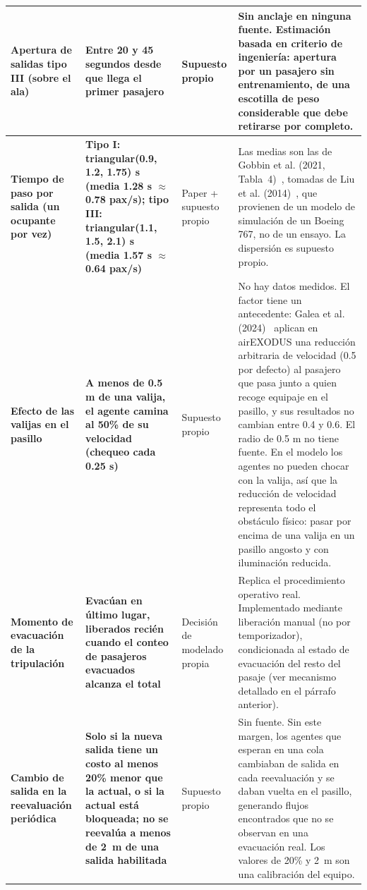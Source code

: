 \documentclass[a4paper, 11pt]{article}
\begin{document}
{\begin{longtable}{L{2.6cm}L{3.2cm}L{2.2cm}L{5.7cm}}
\midrule
\textbf{Apertura de salidas tipo III (sobre el ala)} & \textbf{Entre 20 y 45 segundos desde que llega el primer pasajero} & Supuesto propio & Sin anclaje en ninguna fuente. Estimaci\'on basada en criterio de ingenier\'ia: apertura por un pasajero sin entrenamiento, de una escotilla de peso considerable que debe retirarse por completo. \\
\midrule
\textbf{Tiempo de paso por salida (un ocupante por vez)} & \textbf{Tipo I: triangular(0.9, 1.2, 1.75) s (media 1.28 s $\approx$ 0.78 pax/s); tipo III: triangular(1.1, 1.5, 2.1) s (media 1.57 s $\approx$ 0.64 pax/s)} & Paper + supuesto propio & Las medias son las de Gobbin et al. (2021, Tabla~4)~\cite{gobbin2021}, tomadas de Liu et al. (2014)~\cite{liu2014}, que provienen de un modelo de simulaci\'on de un Boeing 767, no de un ensayo. La dispersi\'on es supuesto propio. \\
\midrule
\textbf{Efecto de las valijas en el pasillo} & \textbf{A menos de 0.5 m de una valija, el agente camina al 50\% de su velocidad (chequeo cada 0.25 s)} & Supuesto propio & No hay datos medidos. El factor tiene un antecedente: Galea et al. (2024)~\cite{galea2024luggage} aplican en airEXODUS una reducci\'on arbitraria de velocidad (0.5 por defecto) al pasajero que pasa junto a quien recoge equipaje en el pasillo, y sus resultados no cambian entre 0.4 y 0.6. El radio de 0.5 m no tiene fuente. En el modelo los agentes no pueden chocar con la valija, as\'i que la reducci\'on de velocidad representa todo el obst\'aculo f\'isico: pasar por encima de una valija en un pasillo angosto y con iluminaci\'on reducida. \\
\midrule
\textbf{Momento de evacuaci\'on de la tripulaci\'on} & \textbf{Evac\'uan en \'ultimo lugar, liberados reci\'en cuando el conteo de pasajeros evacuados alcanza el total} & Decisi\'on de modelado propia & Replica el procedimiento operativo real. Implementado mediante liberaci\'on manual (no por temporizador), condicionada al estado de evacuaci\'on del resto del pasaje (ver mecanismo detallado en el p\'arrafo anterior). \\
\midrule
\textbf{Cambio de salida en la reevaluaci\'on peri\'odica} & \textbf{Solo si la nueva salida tiene un costo al menos 20\% menor que la actual, o si la actual est\'a bloqueada; no se reeval\'ua a menos de 2~m de una salida habilitada} & Supuesto propio & Sin fuente. Sin este margen, los agentes que esperan en una cola cambiaban de salida en cada reevaluaci\'on y se daban vuelta en el pasillo, generando flujos encontrados que no se observan en una evacuaci\'on real. Los valores de 20\% y 2~m son una calibraci\'on del equipo. \\
\end{longtable}
}
\end{document}
